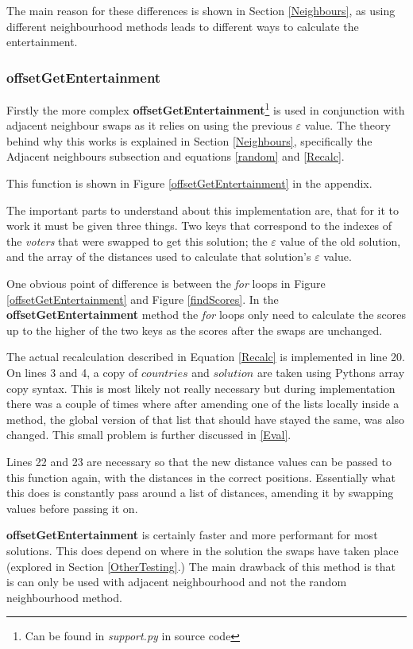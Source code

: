 \documentclass[12pt]{report}
\begin{document}
The main reason for these differences is shown in Section \ref{Neighbours}, as using different neighbourhood methods leads to different ways to calculate the entertainment. 

\subsubsection{offsetGetEntertainment}
Firstly the more complex \textbf{offsetGetEntertainment}\footnote{Can be found in \textit{support.py} in source code} is used in conjunction with adjacent neighbour swaps as it relies on using the previous $\varepsilon$ value. The theory behind why this works is explained in Section \ref{Neighbours}, specifically the Adjacent neighbours subsection and equations \ref{random} and \ref{Recalc}.

This function is shown in Figure \ref{offsetGetEntertainment} in the appendix.

The important parts to understand about this implementation are, that for it to work it must be given three things. Two keys that correspond to the indexes of the \textit{voters} that were swapped to get this solution; the $\varepsilon$ value of the old solution, and the array of the distances used to calculate that solution's $\varepsilon$ value.

One obvious point of difference is between the \textit{for} loops in Figure \ref{offsetGetEntertainment} and Figure \ref{findScores}. In the \textbf{offsetGetEntertainment} method the \textit{for} loops only need to calculate the scores up to the higher of the two keys as the scores after the swaps are unchanged.

The actual recalculation described in Equation \ref{Recalc} is implemented in line 20. On lines 3 and 4, a copy of $countries$ and $solution$ are taken using Pythons array copy syntax. This is most likely not really necessary but during implementation there was a couple of times where after amending one of the lists locally inside a method, the global version of that list that should have stayed the same, was also changed. This small problem is further discussed in \ref{Eval}.

Lines 22 and 23 are necessary so that the new distance values can be passed to this function again, with the distances in the correct positions. Essentially what this does is constantly pass around a list of distances, amending it by swapping values before passing it on.

\textbf{offsetGetEntertainment} is certainly faster and more performant for most solutions. This does depend on where in the solution the swaps have taken place (explored in Section \ref{OtherTesting}.) The main drawback of this method is that is can only be used with adjacent neighbourhood and not the random neighbourhood method.
\end{document}
